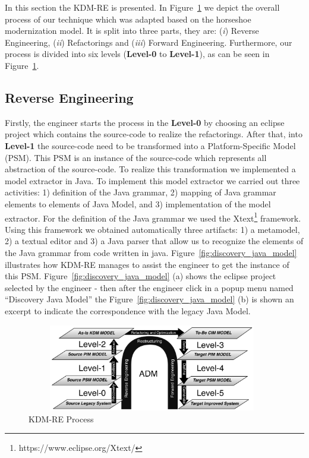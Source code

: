 In this section the KDM-RE is presented. 
In Figure~\ref{fig:process} we depict the overall process of our technique which was adapted based on the horseshoe modernization model. 
It is split into three parts, they are: 
(\textit{i}) Reverse Engineering, 
(\textit{ii}) Refactorings and 
(\textit{iii}) Forward Engineering. 
Furthermore, our process is divided into six levels (\textbf{Level-0} to \textbf{Level-1}), as can be seen in Figure~\ref{fig:process}. 

\subsection{Reverse Engineering}

Firstly, the engineer starts the process in the \textbf{Level-0} by choosing an eclipse project which contains the source-code to realize the refactorings.  
After that, into \textbf{Level-1} the source-code need to be transformed into a Platform-Specific Model (PSM). 
This PSM is an instance of the source-code which represents all abstraction of the source-code. To realize this transformation we implemented a model extractor in Java. To implement this model extractor we carried out three activities: 1) definition of the Java grammar, 2) mapping of Java grammar elements to elements of Java Model, and 3) implementation of the model extractor. For the definition of the Java grammar we used the Xtext\footnote{https://www.eclipse.org/Xtext/} framework. Using this framework we obtained automatically three artifacts: 1) a metamodel, 2) a textual editor and 3) a Java parser that allow us to recognize the elements of the Java grammar from code written in java. 
Figure~\ref{fig:discovery_java_model} illustrates how KDM-RE manages to assist the engineer to get the instance of this PSM. Figure~\ref{fig:discovery_java_model} (a) shows the eclipse project selected by the engineer - then after the engineer click in a popup menu named ``Discovery Java Model'' the Figure~\ref{fig:discovery_java_model} (b) is shown an excerpt to indicate the correspondence with the legacy Java Model.

\begin{figure}[!ht]
\centering
  \includegraphics[width=11cm, height=3.8cm]{figure/processoDaFerramenta}
\caption{KDM-RE Process}
\label{fig:process}
\end{figure} 

